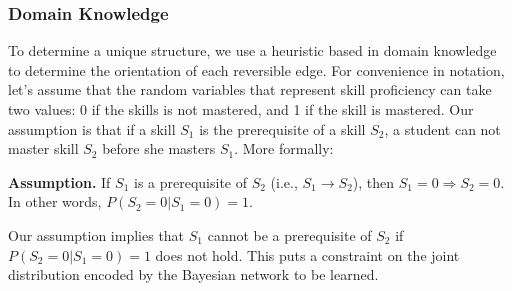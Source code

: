 \documentclass{edm_template}
\begin{document}
	
\subsubsection{Domain Knowledge}
\label{sec:usedomain}
To determine a unique structure, we use a heuristic based in domain knowledge to determine the orientation of each reversible edge.
For convenience in notation, let's assume that the random variables that represent skill proficiency can take two values: 0 if the skills is not mastered, and 1 if the skill is mastered.
Our assumption is that if a skill $S_1$ is the prerequisite of a skill $S_2$, a student can not master skill $S_2$ before she masters $S_1$.
More formally:

\textbf{Assumption.} If $S_1$ is a prerequisite of $S_2$ (i.e., $S_1\rightarrow S_2$), then $S_1=0\Rightarrow S_2=0 $. %
In other words, $P(S_2=\text{0}|S_1=0)=1$.

Our assumption implies  that  $S_1$ cannot be a prerequisite of $S_2$ if $P(S_2=0|S_1=0)=1$ does not hold.
This puts a constraint on the joint distribution encoded by the Bayesian network to be learned.



%
\end{document}
